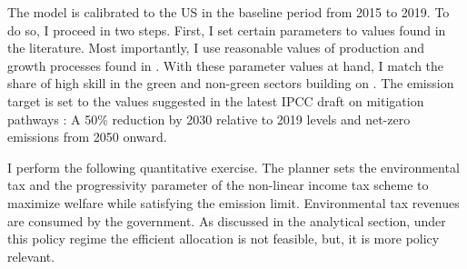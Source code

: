 The model is calibrated to the US in the baseline period from 2015 to 2019. To do so, I proceed in two steps. First, I set certain parameters to values found in the literature. Most importantly, I use reasonable values of production and growth processes found in \cite{Fried2018ClimateAnalysis}. %
With these parameter values at hand, I match the share of high skill in the green and non-green sectors building on \cite{Consoli2016DoCapital}. The emission target is set to the values suggested in the latest IPCC draft on mitigation pathways \citep{IPCC2022}: A 50\% reduction by 2030 relative to 2019 levels and  net-zero emissions from 2050 onward.

I perform the following quantitative exercise. 
 The planner sets the environmental tax and the progressivity parameter of the non-linear income tax scheme to maximize welfare while satisfying the emission limit. Environmental tax revenues are consumed by the government. As discussed in the analytical section, under this policy regime the efficient allocation is not feasible, but, it is  more policy relevant. 

